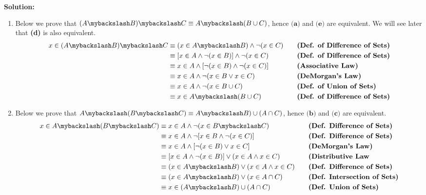 \textbf{Solution:}
\begin{enumerate}[label=(\alph*)]
    \item Below we prove that $(A \mybackslash B) \mybackslash C \equiv A \mybackslash (B \cup C)$, hence $\textbf{(a)}$ and $\textbf{(e)}$ are equivalent. We will see later that \textbf{(d)} is also equivalent.
    \begin{alignat*}{2}
        x \in (A \mybackslash B) \mybackslash C &\equiv (x \in A \mybackslash B) \wedge \neg (x \in C) && \quad \textbf{(Def. of Difference of Sets)} \\
        &\equiv [x \in A \wedge \neg (x \in B)] \wedge \neg (x \in C) && \quad \textbf{(Def. of Difference of Sets)} \\
        &\equiv x \in A \wedge [\neg (x \in B) \wedge \neg (x \in C)] && \quad \textbf{(Associative Law)} \\
        &\equiv x \in A \wedge \neg (x \in B \vee x \in C) && \quad \textbf{(DeMorgan's Law)} \\
        &\equiv x \in A \wedge \neg (x \in B \cup C) && \quad \textbf{(Def. of Union of Sets)} \\
        &\equiv x \in A \mybackslash (B \cup C) && \quad \textbf{(Def. of Difference of Sets)} \\
    \end{alignat*}
    
    \item Below we prove that $A \mybackslash (B \mybackslash C) \equiv A \mybackslash B) \cup (A \cap C)$, hence $\textbf{(b)}$ and $\textbf{(c)}$ are equivalent.
    \begin{alignat*}{2}
        x \in A \mybackslash (B \mybackslash C) &\equiv x \in A \wedge \neg (x \in B \mybackslash C) && \quad \textbf{(Def. Difference of Sets)}\\
        &\equiv x \in A \wedge \neg [x \in B \wedge \neg (x \in C)] && \quad \textbf{(Def. Difference of Sets)}\\
        &\equiv x \in A \wedge [\neg (x \in B) \vee x \in C] && \quad \textbf{(DeMorgan's Law)}\\
        &\equiv [x \in A \wedge \neg (x \in B)] \vee (x \in A \wedge x \in C) && \quad \textbf{(Distributive Law}\\
        &\equiv (x \in A \mybackslash B) \vee (x \in A \wedge x \in C) && \quad \textbf{(Def. Difference of Sets)}\\
        &\equiv (x \in A \mybackslash B) \vee (x \in A \cap C) && \quad \textbf{(Def. Intersection of Sets)}\\
        &\equiv x \in (A \mybackslash B) \cup (A \cap C) && \quad \textbf{(Def. Union of Sets)}\\
    \end{alignat*}
    

\end{enumerate}
